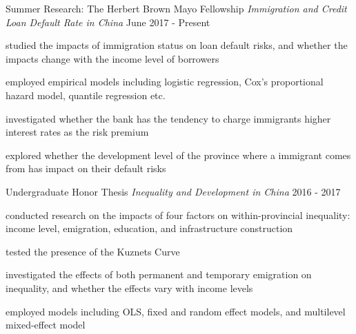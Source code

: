 

\begin{cventries}

  \cventry
    {Summer Research: The Herbert Brown Mayo Fellowship} %
    {\emph{Immigration and Credit Loan Default Rate in China}} %
    {}
    {June 2017 - Present} %
    {
      \begin{cvitems} %
        \item {studied the impacts of immigration status on loan default risks, and whether the impacts change with the income level of borrowers}
        \item {employed empirical models including logistic regression, Cox's proportional hazard model, quantile regression etc.}
        \item {investigated whether the bank has the tendency to charge immigrants higher interest rates as the risk premium}
        \item {explored whether the development level of the province where a immigrant comes from has impact on their default risks}
      \end{cvitems}
    }

 \cventry
    {Undergraduate Honor Thesis} %
    {\emph{Inequality and Development in China}} %
    {}
    {2016 - 2017} %
    {
      \begin{cvitems} %
        \item {conducted research on the impacts of four factors on within-provincial inequality: income level, emigration, education, and infrastructure construction}
        \item {tested the presence of the Kuznets Curve} 
        \item {investigated the effects of both permanent and temporary emigration on inequality, and whether the effects vary with income levels}
        \item{employed models including OLS, fixed and random effect models, and multilevel mixed-effect model}   
      \end{cvitems}
    }

\end{cventries}
